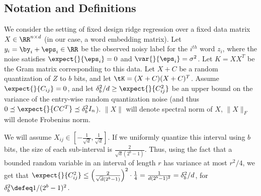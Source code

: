 
%


\subsection{Notation and Definitions}
We consider the setting of fixed design ridge regression over a fixed data matrix $X \in \RR^{n\times d}$ (in our case, a word embedding matrix). Let $y_i = \by_i + \eps_i \in \RR$ be the observed noisy label for the $i^{th}$ word $z_i$, where the noise satisfies $\expect{}{\eps_i} = 0$ and $\var{}{\eps_i} = \sigma^2$.  Let $K = XX^T$ be the Gram matrix corresponding to this data.  Let $X+C$ be a random quantization of $Z$ to $b$ bits, and let $\tK = (X+C)(X+C)^T$. Assume $\expect{}{C_{ij}} = 0$, and let $\delta_b^2/d \geq \expect{}{C_{ij}^2}$ be an upper bound on the variance of the entry-wise random quantization noise (and thus $0 \preceq \expect{}{CC^T} \preceq \delta_b^2 I_n$).  $\|X\|$ will denote spectral norm of $X$, $\|X\|_F$ will denote Frobenius norm.

We will assume $X_{ij} \in [-\frac{1}{\sqrt{d}},\frac{1}{\sqrt{d}}]$.  If we uniformly quantize this interval using $b$ bits, the size of each sub-interval is $\frac{2}{\sqrt{d}(2^b-1)}$.  Thus, using the fact that a bounded random variable in an interval of length $r$ has variance at most $r^2/4$, we get that $\expect{}{C_{ij}^2} \leq \Big(\frac{2}{\sqrt{d}(2^b-1)}\Big)^2\cdot \frac{1}{4} = \frac{1}{d(2^b-1)^2} = \delta_b^2/d$, for $\delta_b^2 \defeq 1/(2^b-1)^2$.

 
%


